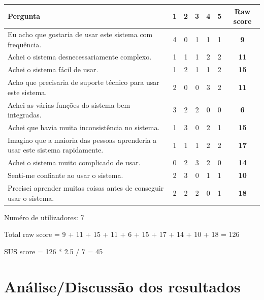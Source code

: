 \documentclass[a4paper,12pt]{article}
\begin{document}
\begin{table}[h!]
    \centering
    \begin{tabular}{|m{10cm}|c|c|c|c|c|c|}
    \hline
    \textbf{Pergunta}                  & \textbf{1} & \textbf{2} & \textbf{3} & \textbf{4} & \textbf{5} & \textbf{Raw score} \\ \hline
    Eu acho que gostaria de usar este sistema com frequência.                       & 4 & 0 & 1 & 1 & 1 & \textbf{9} \\ \hline
    Achei o sistema desnecessariamente complexo.                                    & 1 & 1 & 1 & 2 & 2 & \textbf{11} \\ \hline
    Achei o sistema fácil de usar.                                                  & 1 & 2 & 1 & 1 & 2 & \textbf{15} \\ \hline
    Acho que precisaria de suporte técnico para usar este sistema.                  & 2 & 0 & 0 & 3 & 2 & \textbf{11} \\ \hline
    Achei as várias funções do sistema bem integradas.                              & 3 & 2 & 2 & 0 & 0 & \textbf{6} \\ \hline
    Achei que havia muita inconsistência no sistema.                                & 1 & 3 & 0 & 2 & 1 & \textbf{15} \\ \hline
    Imagino que a maioria das pessoas aprenderia a usar este sistema rapidamente.   & 1 & 1 & 1 & 2 & 2 & \textbf{17} \\ \hline
    Achei o sistema muito complicado de usar.                                       & 0 & 2 & 3 & 2 & 0 & \textbf{14} \\ \hline
    Senti-me confiante ao usar o sistema.                                           & 2 & 3 & 0 & 1 & 1 & \textbf{10} \\ \hline
    Precisei aprender muitas coisas antes de conseguir usar o sistema.              & 2 & 2 & 2 & 0 & 1 & \textbf{18} \\ \hline
    \end{tabular}
\end{table}

Numéro de utilizadores: 7

Total raw score = 9 + 11 + 15 + 11 + 6 + 15 + 17 + 14 + 10 + 18 = 126

SUS score = 126 * 2.5 / 7 = 45

\newpage
\section{Análise/Discussão dos resultados}
\end{document}
